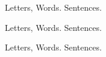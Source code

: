   \nonfrenchspacing
   Letters, Words. Sentences.          \par
   Letters, Words. Sentences.          \par
   Letters, Words. Sentences.
